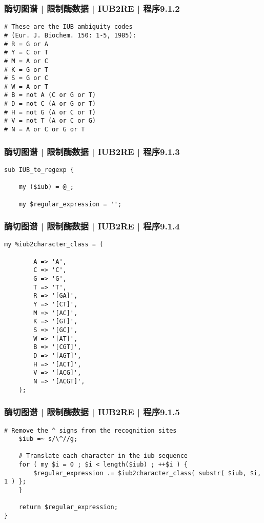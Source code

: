 \begin{frame}[fragile]
  \frametitle{酶切图谱 | 限制酶数据 | IUB2RE | 程序9.1.2}
\begin{lstlisting}[firstnumber=7]
# These are the IUB ambiguity codes
# (Eur. J. Biochem. 150: 1-5, 1985):
# R = G or A
# Y = C or T
# M = A or C
# K = G or T
# S = G or C
# W = A or T
# B = not A (C or G or T)
# D = not C (A or G or T)
# H = not G (A or C or T)
# V = not T (A or C or G)
# N = A or C or G or T
\end{lstlisting}
\end{frame}

\begin{frame}[fragile]
  \frametitle{酶切图谱 | 限制酶数据 | IUB2RE | 程序9.1.3}
\begin{lstlisting}[firstnumber=21]
sub IUB_to_regexp {

    my ($iub) = @_;

    my $regular_expression = '';
\end{lstlisting}
\end{frame}

\begin{frame}[fragile]
  \frametitle{酶切图谱 | 限制酶数据 | IUB2RE | 程序9.1.4}
  \vspace{-0.6em}
\begin{lstlisting}[firstnumber=27,basicstyle=\small\tt,numberstyle=\footnotesize]
    my %iub2character_class = (

        A => 'A',
        C => 'C',
        G => 'G',
        T => 'T',
        R => '[GA]',
        Y => '[CT]',
        M => '[AC]',
        K => '[GT]',
        S => '[GC]',
        W => '[AT]',
        B => '[CGT]',
        D => '[AGT]',
        H => '[ACT]',
        V => '[ACG]',
        N => '[ACGT]',
    );
\end{lstlisting}
\end{frame}

\begin{frame}[fragile]
  \frametitle{酶切图谱 | 限制酶数据 | IUB2RE | 程序9.1.5}
\begin{lstlisting}[firstnumber=46]
    # Remove the ^ signs from the recognition sites
    $iub =~ s/\^//g;

    # Translate each character in the iub sequence
    for ( my $i = 0 ; $i < length($iub) ; ++$i ) {
        $regular_expression .= $iub2character_class{ substr( $iub, $i, 1 ) };
    }

    return $regular_expression;
}
\end{lstlisting}
\end{frame}


